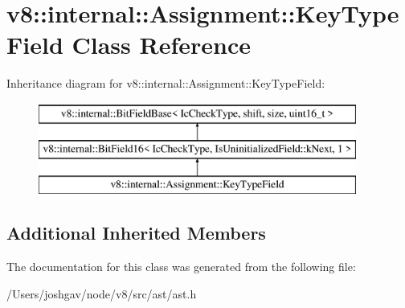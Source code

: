 \hypertarget{classv8_1_1internal_1_1_assignment_1_1_key_type_field}{}\section{v8\+:\+:internal\+:\+:Assignment\+:\+:Key\+Type\+Field Class Reference}
\label{classv8_1_1internal_1_1_assignment_1_1_key_type_field}
Inheritance diagram for v8\+:\+:internal\+:\+:Assignment\+:\+:Key\+Type\+Field\+:\begin{figure}[H]
\begin{center}
\leavevmode
\includegraphics[height=3.000000cm]{classv8_1_1internal_1_1_assignment_1_1_key_type_field}
\end{center}
\end{figure}
\subsection*{Additional Inherited Members}


The documentation for this class was generated from the following file\+:\begin{DoxyCompactItemize}
\item 
/\+Users/joshgav/node/v8/src/ast/ast.\+h\end{DoxyCompactItemize}
